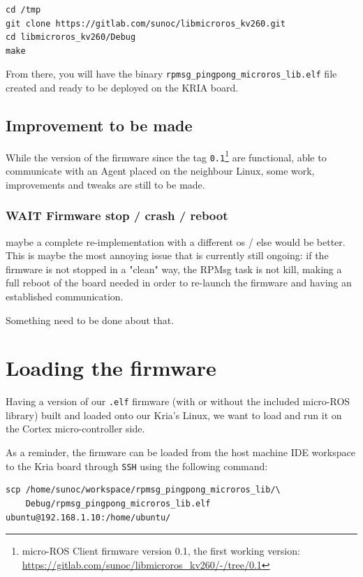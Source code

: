 \documentclass[10pt]{article}
\begin{document}
\begin{verbatim}
cd /tmp
git clone https://gitlab.com/sunoc/libmicroros_kv260.git
cd libmicroros_kv260/Debug
make
\end{verbatim}

From there, you will have the binary \texttt{rpmsg\_pingpong\_microros\_lib.elf} file created and ready to be deployed
on the KRIA board.

\subsection{Improvement to be made}
\label{sec:org67bb0d4}
While the version of the firmware since the tag \texttt{0.1}\footnote{micro-ROS Client firmware version 0.1, the first working version: \url{https://gitlab.com/sunoc/libmicroros\_kv260/-/tree/0.1}} are functional, able to communicate with
an Agent placed on the neighbour Linux, some work, improvements and tweaks are still to be made.

\subsubsection{{\bfseries\sffamily WAIT} Firmware stop / crash / reboot}
\label{sec:org7251d37}
  maybe a complete re-implementation with a different os / else
  would be better.
This is maybe the most annoying issue that is currently still ongoing: if the firmware
is not stopped in a "clean" way, the RPMsg task is not kill, making a full reboot of the board
needed in order to re-launch the firmware and having an established communication.

Something need to be done about that.

\pagebreak
\section{Loading the firmware}
\label{sec:org49dd1b7}
Having a version of our \texttt{.elf} firmware (with or without the included
micro-ROS library) built and loaded onto our Kria's Linux, we want to load and run it
on the Cortex micro-controller side.

As a reminder, the firmware can be loaded from the host machine IDE workspace
to the Kria board through \texttt{SSH} using the following command:
\begin{verbatim}
scp /home/sunoc/workspace/rpmsg_pingpong_microros_lib/\
    Debug/rpmsg_pingpong_microros_lib.elf  ubuntu@192.168.1.10:/home/ubuntu/
\end{verbatim}
\end{document}
